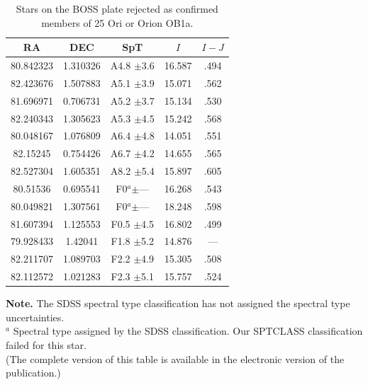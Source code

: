 \documentclass[12pt]{article}
\begin{document}
\begin{table}[hr!] \scriptsize
\begin{center}
 \caption[Stars on the BOSS plate rejected as confirmed members of 25 Ori or Orion OB1a]{Stars on the BOSS plate rejected as confirmed members of 25 Ori or Orion OB1a.}
 \label{tab_BOSS:field_stars}
 \begin{threeparttable}
  	\setlength{\tabcolsep}{20pt}
	\begin{tabular}{ccccc}
	\toprule
	{\bf RA} & {\bf DEC} & {\bf SpT} & $I$ & $I-J$ \\
	\midrule
	80.842323 & 1.310326 & A4.8  $\pm$3.6   & 16.587 & .494  \\
	82.423676 & 1.507883 & A5.1  $\pm$3.9   & 15.071 & .562  \\
	81.696971 & 0.706731 & A5.2  $\pm$3.7   & 15.134 & .530  \\
	82.240343 & 1.305623 & A5.3  $\pm$4.5   & 15.242 & .568  \\
	80.048167 & 1.076809 & A6.4  $\pm$4.8   & 14.051 & .551  \\
	82.15245  & 0.754426 & A6.7  $\pm$4.2   & 14.655 & .565  \\
	82.527304 & 1.605351 & A8.2  $\pm$5.4   & 15.897 & .605  \\
	80.51536  & 0.695541 & F0$^a$$\pm$---   & 16.268 & .543  \\
	80.049821 & 1.307561 & F0$^a$$\pm$---   & 18.248 & .598  \\
	81.607394 & 1.125553 & F0.5  $\pm$4.5   & 16.802 & .499  \\
	79.928433 & 1.42041  & F1.8  $\pm$5.2   & 14.876 & ---   \\
	82.211707 & 1.089703 & F2.2  $\pm$4.9   & 15.305 & .508  \\
	82.112572 & 1.021283 & F2.3  $\pm$5.1   & 15.757 & .524  \\
	\bottomrule
	\end{tabular}
	\begin{tablenotes}
	  {\bf Note.} The SDSS spectral type classification has not assigned the spectral type uncertainties.\\
	  $^a$ Spectral type assigned by the SDSS classification. Our SPTCLASS classification failed for this star.\\
	  (The complete version of this table is available in the electronic version of the \citealt{Suarez2017} publication.)\\
	\end{tablenotes}
 \end{threeparttable}
\end{center}
\end{table}
\end{document}
